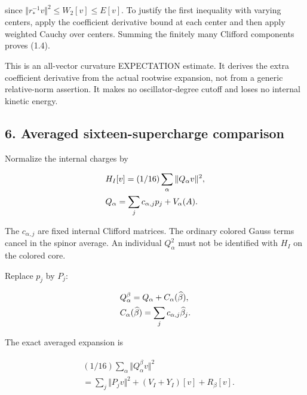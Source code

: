 since \(\Vert r_{*}^{-1}v\Vert ^{2}\le W_{2}[v]\le E[v]\). To justify
the first inequality with varying centers, apply the coefficient
derivative bound at each center and then apply weighted Cauchy over
centers. Summing the finitely many Clifford components proves (1.4).

This is an all-vector curvature EXPECTATION estimate. It derives the
extra coefficient derivative from the actual rootwise expansion, not
from a generic relative-norm assertion. It makes no oscillator-degree
cutoff and loses no internal kinetic energy.

\subsection{6. Averaged sixteen-supercharge
comparison}\label{g-averaged-sixteen-supercharge-comparison}

Normalize the internal charges by

\begin{gather*}
\begin{aligned}
& H_{I}[v]=(1/16)\sum _{\alpha} \Vert Q_{\alpha} v\Vert ^{2}, \\
& Q_{\alpha}=\sum _{j} c_{\alpha ,j}p_{j}+V_{\alpha}(A).
\end{aligned}\notag
\end{gather*}

The \(c_{\alpha ,j}\) are fixed internal Clifford matrices. The ordinary
colored Gauss terms cancel in the spinor average. An individual
\(Q_{\alpha}^{2}\) must not be identified with \(H_{I}\) on the colored
core.

Replace \(p_{j}\) by \(P_{j}\):

\begin{gather*}
\begin{aligned}
& Q_{\alpha}^{\beta}=Q_{\alpha}+C_{\alpha}(\widehat{\beta}), \\
& C_{\alpha}(\widehat{\beta})=\sum _{j} c_{\alpha ,j} \widehat{\beta}_{j}.
\end{aligned}\notag
\end{gather*}

The exact averaged expansion is

\begin{gather*}
\begin{aligned}
& (1/16)\sum _{\alpha} \Vert Q_{\alpha}^{\beta} v\Vert ^{2} \\
& =\sum _{j}\Vert P_{j} v\Vert ^{2}+(V_{I}+Y_{I})[v]+R_{\beta}[v].
\end{aligned}\tag{6.1}
\end{gather*}

